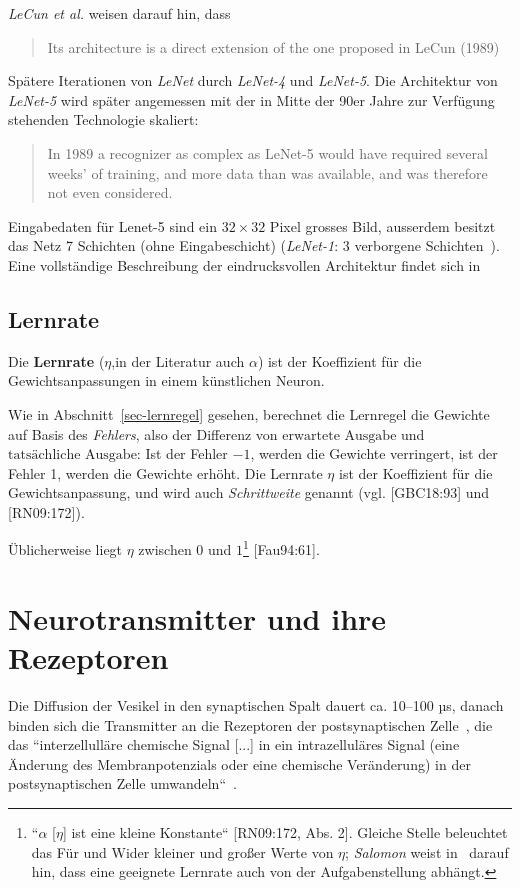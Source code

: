 {\textit{LeCun et al.} weisen darauf hin, dass

\blockquote[{\cite[544]{CBD+89}}]{
    Its architecture is a direct extension of the one proposed in LeCun (1989)
}
\noindent
Spätere Iterationen von \textit{LeNet} durch \textit{LeNet-4} und \textit{LeNet-5}. Die Architektur von \textit{LeNet-5} wird später angemessen mit der in Mitte der 90er Jahre zur Verfügung stehenden Technologie skaliert:

\blockquote[{\cite[15]{CBBH98}}]{
    In 1989 a recognizer as complex as LeNet-5 would have required several weeks' of training, and more data than was available, and was therefore not even considered.
}
\noindent
Eingabedaten für Lenet-5 sind ein $32 \times 32$ Pixel grosses Bild, ausserdem besitzt das Netz 7 Schichten (ohne Eingabeschicht) (\textit{LeNet-1}: 3 verborgene Schichten~\cite[544]{CBD+89}).
Eine vollständige Beschreibung der eindrucksvollen Architektur findet sich in\cite[7 f.]{CBBH98}

\subsection*{Lernrate}
Die \textbf{Lernrate} ($\eta$,in der Literatur auch $\alpha$) ist der Koeffizient für die Gewichtsanpassungen in einem künstlichen Neuron.

Wie in Abschnitt~\ref{sec-lernregel} gesehen, berechnet die Lernregel die Gewichte auf Basis des \textit{Fehlers}, also der Differenz von $\text{erwartete Ausgabe}$ und $\text{tatsächliche Ausgabe}$: Ist der Fehler $-1$, werden die Gewichte verringert, ist der Fehler 1, werden die Gewichte erhöht.
Die Lernrate $\eta$ ist der Koeffizient für die Gewichtsanpassung, und wird auch \textit{Schrittweite} genannt (vgl. [GBC18:93] und [RN09:172]).

Üblicherweise liegt $\eta$ zwischen $0$ und $1$\footnote{
    ``$\alpha$ [$\eta$] ist eine kleine Konstante`` [RN09:172, Abs. 2]. Gleiche Stelle beleuchtet das Für und Wider kleiner und großer Werte von $\eta$; \textit{Salomon} weist in~\cite[173]{Sal90} darauf hin, dass eine geeignete Lernrate auch von der Aufgabenstellung abhängt.
} [Fau94:61].



\section{Neurotransmitter und ihre Rezeptoren}

Die Diffusion der Vesikel in den synaptischen Spalt dauert ca. 10–100 µs, danach binden sich die Transmitter an die Rezeptoren der postsynaptischen Zelle~\cite[96]{HS19a}, die das ``interzellulläre chemische Signal [...] in ein intrazelluläres Signal (eine Änderung des Membranpotenzials oder eine chemische Veränderung) in der postsynaptischen Zelle umwandeln``~\cite[123]{BCP18}.

}
